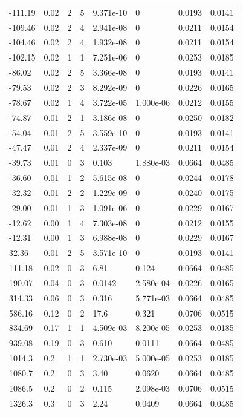 \documentclass[preview]{standalone}
\begin{document}
{{\begin{tabular}{L{1.2cm}C{1.2cm} C{0.3cm}C{0.5cm} C{1.4cm}C{1.4cm} C{1.4cm}C{1.4cm}}
  -111.19  &  0.02  & 2     &  5 &  9.371e-10  & 0  & 0.0193 &  0.0141   \\ 
  -109.46  &  0.02  & 2     &  4 &  2.941e-08  & 0  & 0.0211 &  0.0154   \\ 
  -104.46  &  0.02  & 2     &  4 &  1.932e-08  & 0  & 0.0211 &  0.0154   \\ 
  -102.15  &  0.02  & 1     &  1 &  7.251e-06  & 0  & 0.0253 &  0.0185   \\ 
  -86.02  &  0.02  & 2     &  5 &  3.366e-08  & 0  & 0.0193 &  0.0141   \\ 
  -79.53  &  0.02  & 2     &  3 &  8.292e-09  & 0  & 0.0226 &  0.0165   \\ 
  -78.67  &  0.02  & 1     &  4 &  3.722e-05  & 1.000e-06  & 0.0212 &  0.0155   \\ 
  -74.87  &  0.01  & 2     &  1 &  3.186e-08  & 0  & 0.0250 &  0.0182   \\ 
  -54.04  &  0.01  & 2     &  5 &  3.559e-10  & 0  & 0.0193 &  0.0141   \\ 
  -47.47  &  0.01  & 2     &  4 &  2.337e-09  & 0  & 0.0211 &  0.0154   \\ 
  -39.73  &  0.01  & 0     &  3 &  0.103  & 1.880e-03  & 0.0664 &  0.0485   \\ 
  -36.60  &  0.01  & 1     &  2 &  5.615e-08  & 0  & 0.0244 &  0.0178   \\ 
  -32.32  &  0.01  & 2     &  2 &  1.229e-09  & 0  & 0.0240 &  0.0175   \\ 
  -29.00  &  0.01  & 1     &  3 &  1.091e-06  & 0  & 0.0229 &  0.0167   \\ 
  -12.62  &  0.00  & 1     &  4 &  7.303e-08  & 0  & 0.0212 &  0.0155   \\ 
  -12.31  &  0.00  & 1     &  3 &  6.988e-08  & 0  & 0.0229 &  0.0167   \\ 
  32.36  &  0.01  & 2     &  5 &  3.571e-10  & 0  & 0.0193 &  0.0141   \\ 
  111.18  &  0.02  & 0     &  3 &  6.81  & 0.124  & 0.0664 &  0.0485   \\ 
  190.07  &  0.04  & 0     &  3 &  0.0142  & 2.580e-04  & 0.0226 &  0.0165   \\ 
  314.33  &  0.06  & 0     &  3 &  0.316  & 5.771e-03  & 0.0664 &  0.0485   \\ 
  586.16  &  0.12  & 0     &  2 &  17.6  & 0.321  & 0.0706 &  0.0515   \\ 
  834.69  &  0.17  & 1     &  1 &  4.509e-03  & 8.200e-05  & 0.0253 &  0.0185   \\ 
  939.08  &  0.19  & 0     &  3 &  0.610  & 0.0111  & 0.0664 &  0.0485   \\ 
  1014.3  &   0.2  & 1     &  1 &  2.730e-03  & 5.000e-05  & 0.0253 &  0.0185   \\ 
  1080.7  &   0.2  & 0     &  3 &  3.40  & 0.0620  & 0.0664 &  0.0485   \\ 
  1086.5  &   0.2  & 0     &  2 &  0.115  & 2.098e-03  & 0.0706 &  0.0515   \\ 
  1326.3  &   0.3  & 0     &  3 &  2.24  & 0.0409  & 0.0664 &  0.0485   \\ 
\hline 
\end{tabular} 

}}
\end{document}
